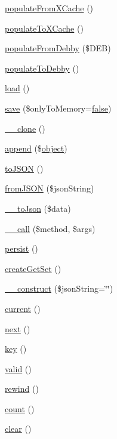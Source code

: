 \begin{DoxyCompactItemize}
\item 
\hyperlink{classOlga_ab67e7ac76ef6a557814cd7ac213dc430}{populate\+From\+X\+Cache} ()
\item 
\hyperlink{classOlga_ab8a8d78ed128b8d61de03ea5655b3d56}{populate\+To\+X\+Cache} ()
\item 
\hyperlink{classOlga_ab1486ce669a2e243f9af2f568acb96a5}{populate\+From\+Debby} (\$D\+E\+B)
\item 
\hyperlink{classOlga_a8710c283121a75c551f0beb7eeaf4aa1}{populate\+To\+Debby} ()
\item 
\hyperlink{classOlga_a3ce181004b4dc00140033a7a27eeb747}{load} ()
\item 
\hyperlink{classOlga_a2d4f4e863fd7f9c3e4fee16211b01c53}{save} (\$only\+To\+Memory=\hyperlink{tina4_8php_aec2deb5590a84bee262c3bea206ae88f}{false})
\item 
\hyperlink{classOlga_a83be44e261718dbad296228b541a6c79}{\+\_\+\+\_\+clone} ()
\item 
\hyperlink{classOlga_a183d3f4eab720c297684ccdac5c627b9}{append} (\$\hyperlink{Shape_8php_a774642dc290de09e3aff55c8b594113f}{object})
\item 
\hyperlink{classOlga_af49d06e30d44fab89411ee8994c530fa}{to\+J\+S\+O\+N} ()
\item 
\hyperlink{classOlga_a0f2252c2c92246037adb8ba532e85aef}{from\+J\+S\+O\+N} (\$json\+String)
\item 
\hyperlink{classOlga_a87be848339896b4d554e0189f5ec23d4}{\+\_\+\+\_\+to\+Json} (\$data)
\item 
\hyperlink{classOlga_a44a731386b1e7682cbc3b01c0faef9cd}{\+\_\+\+\_\+call} (\$method, \$args)
\item 
\hyperlink{classOlga_ac2e66056e2619f9bbdafa675702780e2}{persist} ()
\item 
\hyperlink{classOlga_ac08323518a6c8131a357f046b5a0e201}{create\+Get\+Set} ()
\item 
\hyperlink{classOlga_a4688feb4c2a9584030f8f6f3b64bb2db}{\+\_\+\+\_\+construct} (\$json\+String=\char`\"{}\char`\"{})
\item 
\hyperlink{classOlga_abe4a13fb8566761eb44fbed7c4125c14}{current} ()
\item 
\hyperlink{classOlga_a0f70223e5588db45cc81241c78391007}{next} ()
\item 
\hyperlink{classOlga_a2ab85e63c42b998496daf20d89fa8a4a}{key} ()
\item 
\hyperlink{classOlga_a9aaaf12a2bbcd99f876e2e9e1dcac02b}{valid} ()
\item 
\hyperlink{classOlga_ae69d5da6af979c897bd3fcf535d07169}{rewind} ()
\item 
\hyperlink{classOlga_abf255c4baa60ff0847c0ddc8f41d19f1}{count} ()
\item 
\hyperlink{classOlga_af2f971a5c1f12094536bb32eb042e649}{clear} ()
\end{DoxyCompactItemize}
